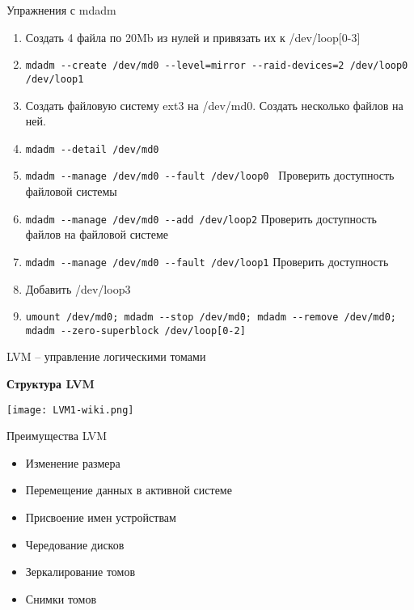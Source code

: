 \documentclass[ignorenonframetext, professionalfonts, hyperref={pdftex, unicode}]{beamer}
\begin{document}
\begin{frame}{Упражнения с mdadm}
    \begin{enumerate}
      \item Создать 4 файла по 20Mb из нулей и привязать их к /dev/loop[0-3]
      \item {\tt mdadm -\phantom{}-create /dev/md0 -\phantom{}-level=mirror -\phantom{}-raid-devices=2 /dev/loop0 /dev/loop1}
      \item Создать файловую систему ext3 на /dev/md0. Создать несколько файлов на ней.
      \item {\tt mdadm -\phantom{}-detail /dev/md0}
      \item {\tt mdadm -\phantom{}-manage /dev/md0 -\phantom{}-fault /dev/loop0 } Проверить доступность файловой системы
      \item {\tt mdadm -\phantom{}-manage /dev/md0 -\phantom{}-add /dev/loop2} Проверить доступность файлов на файловой системе
      \item {\tt mdadm -\phantom{}-manage /dev/md0 -\phantom{}-fault /dev/loop1} Проверить доступность
      \item Добавить /dev/loop3
      \item {\tt umount /dev/md0; mdadm -\phantom{}-stop /dev/md0; mdadm -\phantom{}-remove /dev/md0; mdadm -\phantom{}-zero-superblock /dev/loop[0-2]}
    \end{enumerate}
\end{frame}

\begin{frame}{LVM -- управление логическими томами}
  \begin{center}
    \textbf{Структура LVM}
  \end{center}
  \texttt{[image: LVM1-wiki.png]}
\end{frame}

\begin{frame}{Преимущества LVM}
	\begin{itemize}
		\item Изменение размера
		\item Перемещение данных в активной системе
		\item Присвоение имен устройствам
		\item Чередование дисков
		\item Зеркалирование томов
		\item Снимки томов
	\end{itemize}
\end{frame}
 
\end{document}
